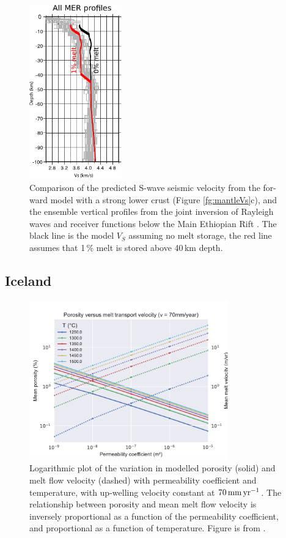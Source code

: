 \begin{figure}
\centering
\includegraphics[width=4cm]{./figures/ch2-MER-Vs.pdf}
\caption{Comparison of the predicted S-wave seismic velocity from the for-ward model with a strong lower crust (Figure \ref{fg:mantleVs}c), and the ensemble vertical profiles from the joint inversion of Rayleigh waves and receiver functions below the Main Ethiopian Rift \citep{keranen-etal-2009}. The black line is the model $V_{S}$ assuming no melt storage, the red line assumes that 1\,\% melt is stored above 40\,km depth.}
\label{fg:MER-Vs}
\end{figure}

\subsection{Iceland}

\begin{figure}
\centering
\includegraphics[width=8.6cm]{figures/ch2-phi-vm.pdf}
\caption{Logarithmic plot of the variation in modelled porosity (solid) and melt flow velocity (dashed) with permeability coefficient and temperature, with up-welling velocity constant at $70\rm\,mm\,yr^{-1}$. The relationship between porosity and mean melt flow velocity is inversely proportional as a function of the permeability coefficient, and proportional as a function of temperature. Figure is from \cite{franken-etal-2020}.}
\label{fg:phi-vm}
\end{figure}

